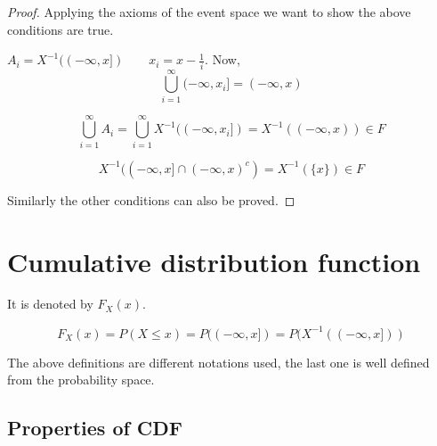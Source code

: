 \documentclass{article}
\begin{document}
\begin{proof}

    Applying the axioms of the event space we want to show the above conditions are true.

    $A_i=X^{-1}((-\infty,x]) \qquad x_i = x - \frac{1}{i}$. Now,
    $$ \bigcup_{i=1}^{\infty} (-\infty,x_i] = (-\infty,x)$$

    $$ \bigcup_{i=1}^{\infty} A_i = \bigcup_{i=1}^{\infty} X^{-1}((-\infty,x_i]) = X^{-1}((-\infty,x)) \in F$$

    $$ X^{-1}((-\infty ,x] \cap {(-\infty,x)}^c) = X^{-1} (\{x\}) \in F$$

    Similarly the other conditions can also be proved.
\end{proof}

\section{Cumulative distribution function}
It is denoted by $F_X(x)$.

$$ F_X(x)= P(X \leq x) = P((-\infty, x])= P(X^{-1}((-\infty, x]))$$

The above definitions are different notations used, the last one is well defined from the probability space.

\subsection{Properties of CDF}
\end{document}

